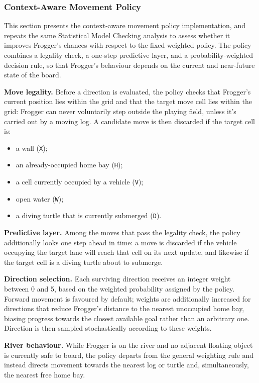 \documentclass[a4paper]{article}
\begin{document}
\subsubsection{Context-Aware Movement Policy}

This section presents the context-aware movement policy
implementation, and repeats the same Statistical Model
Checking analysis to assess whether it improves Frogger's
chances with respect to the fixed weighted policy. The
policy combines a legality check, a one-step predictive
layer, and a probability-weighted decision rule, so that
Frogger's behaviour depends on the current and near-future
state of the board.

\textbf{Move legality.} Before a direction is evaluated,
the policy checks that Frogger's current position lies
within the grid and that the target move cell lies within the grid: 
Frogger can never voluntarily step outside the playing field, unless
it's carried out by a moving log. A candidate move is then discarded if the target
cell is:
\begin{itemize}
    \item a wall (\texttt{X});
    \item an already-occupied home bay (\texttt{H});
    \item a cell currently occupied by a vehicle
        (\texttt{V});
    \item open water (\texttt{W});
    \item a diving turtle that is currently submerged (\texttt{D}).
\end{itemize}

\textbf{Predictive layer.} Among the moves that pass the
legality check, the policy additionally looks one step
ahead in time: a move is discarded if the vehicle occupying
the target lane will reach that cell on its next update, 
and likewise if the target cell is a diving
turtle about to submerge.

\textbf{Direction selection.} Each surviving direction
receives an integer weight between 0 and 5, based on 
the weighted probability assigned by the policy.
Forward movement is favoured by default;
weights are additionally increased for directions that
reduce Frogger's distance to the nearest unoccupied home
bay, biasing progress towards the closest available goal
rather than an arbitrary one. Direction is then sampled
stochastically according to these weights.

\textbf{River behaviour.} While Frogger is on the river and no
adjacent floating object is currently safe to board, the policy departs from
the general weighting rule and instead directs movement towards the
nearest log or turtle and, simultaneously, the nearest free
home bay.
\end{document}
